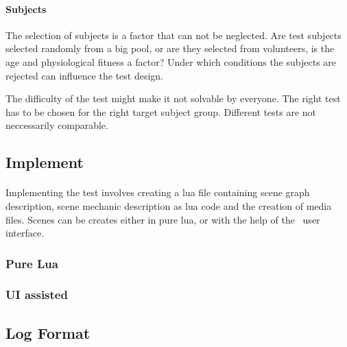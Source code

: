 \paragraph{Subjects}
The selection of subjects is a factor that can not be neglected.
Are test subjects selected randomly from a big pool, or are they selected from volunteers,
is the age and physiological fitness a factor?
Under which conditions the subjects are rejected can influence the test design.

The difficulty of the test might make it not solvable by everyone.
The right test has to be chosen for the right target subject group.
Different tests are not neccessarily comparable.


\subsection{Implement}
\paragraph{}
Implementing the test involves creating a lua file containing scene graph description,
scene mechanic description as lua code and the creation of media files.
Scenes can be creates either in pure lua, or with the help of the \ER\ user interface.

\subsubsection{Pure Lua}
\paragraph{}

\subsubsection{UI assisted}
\paragraph{}


\subsection{Log Format}
\paragraph{}



